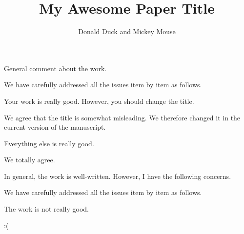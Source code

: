 \documentclass[12pt,USenglish]{scrartcl}
\title{My Awesome Paper Title}
\author{Donald Duck and Mickey Mouse}
\begin{document}
\printtitlepage



\reviewer
\begin{generalcomment}
	General comment about the work.
\end{generalcomment}
\begin{revresponse}
	We have carefully addressed all the issues item by item as follows.
\end{revresponse}

\begin{revcomment}
	Your work is really good. However, you should change the title.
\end{revcomment}
\begin{revresponse}
	We agree that the title is somewhat misleading. We therefore changed it in the current version of the manuscript.
\end{revresponse}

\begin{revcomment}
	Everything else is really good.
\end{revcomment}
\begin{revresponse}
	We totally agree.
\end{revresponse}

\reviewer
\begin{generalcomment}
	In general, the work is well-written. However, I have the following concerns.
\end{generalcomment}
\begin{revresponse}
	We have carefully addressed all the issues item by item as follows.
\end{revresponse}

\begin{revcomment}
	The work is not really good.
\end{revcomment}
\begin{revresponse}
	:(
\end{revresponse}
\end{document}
